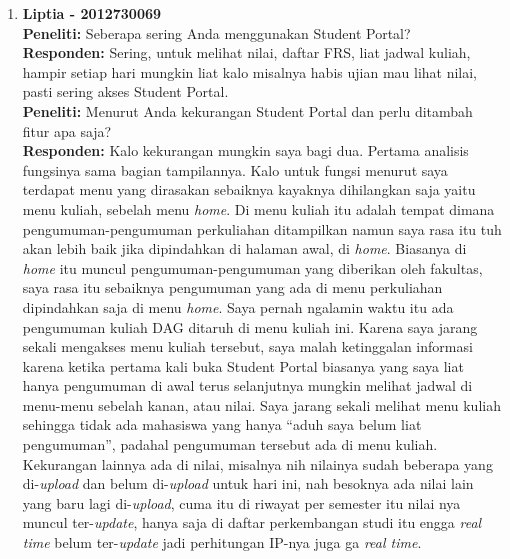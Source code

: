 \begin{enumerate}
	\item\textbf{Liptia - 2012730069}\\
	\textbf{Peneliti:} Seberapa sering Anda menggunakan Student Portal?\\
	\textbf{Responden:} Sering, untuk melihat nilai, daftar FRS, liat jadwal kuliah, hampir setiap hari mungkin liat kalo misalnya habis ujian mau lihat nilai, pasti sering akses Student Portal.\\
	\textbf{Peneliti:} Menurut Anda kekurangan Student Portal dan perlu ditambah fitur apa saja?\\
	\textbf{Responden:} Kalo kekurangan mungkin saya bagi dua. Pertama analisis fungsinya sama bagian tampilannya. Kalo untuk fungsi menurut saya terdapat menu yang dirasakan sebaiknya kayaknya dihilangkan saja yaitu menu kuliah, sebelah menu \textit{home}.
Di menu kuliah itu adalah tempat dimana pengumuman-pengumuman perkuliahan ditampilkan namun saya rasa itu tuh akan lebih baik jika dipindahkan di halaman awal, di \textit{home}.
Biasanya di \textit{home} itu muncul pengumuman-pengumuman yang diberikan oleh fakultas, saya rasa itu sebaiknya pengumuman yang ada di menu perkuliahan dipindahkan saja di menu \textit{home}.
Saya pernah ngalamin waktu itu ada pengumuman kuliah DAG ditaruh di menu kuliah ini. Karena saya jarang sekali mengakses menu kuliah tersebut, saya malah ketinggalan informasi karena ketika pertama kali buka Student Portal biasanya yang saya liat hanya pengumuman di awal terus selanjutnya mungkin melihat jadwal di menu-menu sebelah kanan, atau nilai. Saya jarang sekali melihat menu kuliah sehingga tidak ada mahasiswa yang hanya ``aduh saya belum liat pengumuman'', padahal pengumuman tersebut ada di menu kuliah. Kekurangan lainnya ada di nilai, misalnya nih nilainya sudah beberapa yang di-\textit{upload} dan belum di-\textit{upload} untuk hari ini, nah besoknya ada nilai lain yang baru lagi di-\textit{upload}, cuma itu di riwayat per semester itu nilai nya muncul ter-\textit{update}, hanya saja di daftar perkembangan studi itu engga \textit{real time} belum ter-\textit{update} jadi perhitungan IP-nya juga ga \textit{real time}.

\end{enumerate}
